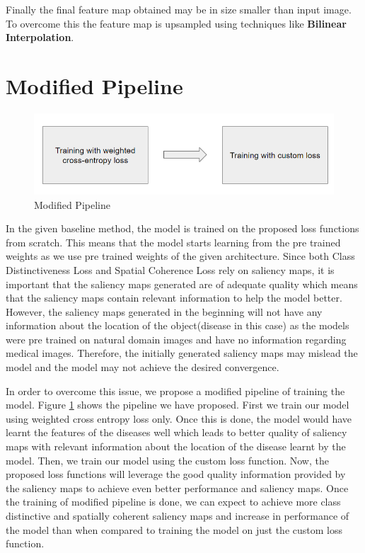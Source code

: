 Finally the final feature map obtained may be in size smaller than input image. To overcome this the feature map is upsampled using techniques like \textbf{Bilinear Interpolation}.


\section{Modified Pipeline}

\begin{figure}[!htbp]
  \begin{center}
    \leavevmode
    \ifpdf
      \includegraphics[scale=0.85]
      {Chapter2/Chapter2Figs/modified_pipeline.png}    
    \fi
    \caption{Modified Pipeline}
    \label{mod_pipe}
  \end{center}
\end{figure}

In the given baseline method, the model is trained on the proposed loss functions from scratch. This means that the model starts learning from the pre trained weights as we use pre trained weights of the given architecture. Since both Class Distinctiveness Loss and Spatial Coherence Loss rely on saliency maps, it is important that the saliency maps generated are of adequate quality which means that the saliency maps contain relevant information to help the model better. However, the saliency maps generated in the beginning will not have any information about the location of the object(disease in this case) as the models were pre trained on natural domain images and have no information regarding medical images. Therefore, the initially generated saliency maps may mislead the model and the model may not achieve the desired convergence.

In order to overcome this issue, we propose a modified pipeline of training the model. Figure \ref{mod_pipe} shows the pipeline we have proposed. First we train our model using weighted cross entropy loss only. Once this is done, the model would have learnt the features of the diseases well which leads to better quality of saliency maps with relevant information about the location of the disease learnt by the model. Then, we train our model using the custom loss function. Now, the proposed loss functions will leverage the good quality information provided by the saliency maps to achieve even better performance and saliency maps. Once the training of modified pipeline is done, we can expect to achieve more class distinctive and spatially coherent saliency maps and increase in performance of the model than when compared to training the model on just the custom loss function.  

